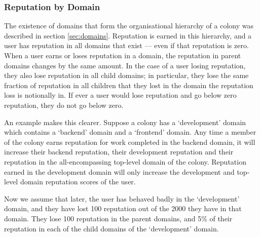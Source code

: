 



%

%
%
\subsubsection{Reputation by Domain}\label{sec:rep-by-domain}
The existence of domains that form the organisational hierarchy of a colony was described in section \ref{sec:domains}. Reputation is earned in this hierarchy, and a user has reputation in all domains that exist --- even if that reputation is zero. When a user earns or loses reputation in a domain, the reputation in parent domains changes by the same amount. In the case of a user losing reputation, they also lose reputation in all child domains; in particular, they lose the same fraction of reputation  in all children that they lost in the domain the reputation loss is notionally in. If ever a user would lose reputation and go below zero reputation, they do not go below zero.

An example makes this clearer. Suppose a colony has a `development' domain which contains a `backend' domain and a `frontend' domain. Any time a member of the colony earns reputation for work completed in the backend domain, it will increase their backend reputation, their development reputation and their reputation in the all-encompassing top-level domain of the colony. Reputation earned in the development domain will only increase the development and top-level domain reputation scores of the user.

Now we assume that later, the user has behaved badly in the `development' domain, and they have lost 100 reputation out of the 2000 they have in that domain. They lose 100 reputation in the parent domains, and 5\% of their reputation in each of the child domains of the `development' domain. 

